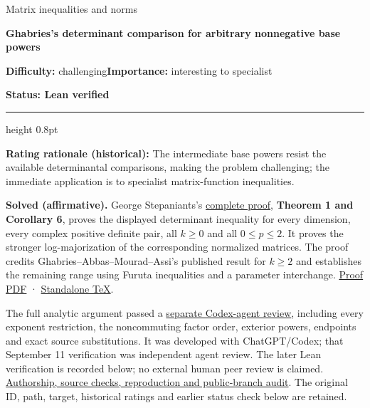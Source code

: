 \documentclass[11pt,a4paper]{article}
\makeatletter
\renewcommand{\subsection}{\Needspace{4\baselineskip}\@startsection{subsection}{2}{0pt}{9pt plus 1pt minus 1pt}{3pt}{\sffamily\bfseries\normalsize\color{ink}}}
\makeatother
\begin{document}
{\sffamily\small\color{muted}Matrix inequalities and norms\par}
\vspace{3pt}
{\raggedright{}\sffamily\bfseries\fontsize{21}{24}\selectfont\color{ink}Ghabries's
determinant comparison for arbitrary nonnegative base powers\par}
\vspace{7pt}
{\sffamily\small\textbf{Difficulty:} challenging\quad\textbf{Importance:} interesting
to specialist\par}
{\sffamily\small\bfseries\color{accent}Status: Lean verified\par}
\vspace{4pt}
{\color{accent}\hrule height 0.8pt}
\vspace{6pt}
\textbf{Rating rationale (historical):} The intermediate base powers
resist the available determinantal comparisons, making the problem
challenging; the immediate application is to specialist matrix-function
inequalities.

\subsection{Resolution --- 2026-09-11}\label{resolution-2026-09-11}

\textbf{Solved (affirmative).} George Stepaniants's
\href{https://github.com/ajt60gaibb/OpenProblemsInNLA/blob/main/matrix-inequalities-and-norms/MI-28/solution.md}{complete
proof}, \textbf{Theorem 1 and Corollary 6}, proves the displayed
determinant inequality for every dimension, every complex positive
definite pair, all \(k\ge0\) and all \(0\le p\le2\). It proves the
stronger log-majorization of the corresponding normalized matrices. The
proof credits Ghabries--Abbas--Mourad--Assi's published result for
\(k\ge2\) and establishes the remaining range using Furuta inequalities
and a parameter interchange.
\href{https://github.com/ajt60gaibb/OpenProblemsInNLA/blob/main/matrix-inequalities-and-norms/MI-28/solution.pdf}{Proof
PDF} ·
\href{https://github.com/ajt60gaibb/OpenProblemsInNLA/blob/main/matrix-inequalities-and-norms/MI-28/solution.tex}{Standalone
TeX}.

The full analytic argument passed a
\href{https://github.com/ajt60gaibb/OpenProblemsInNLA/blob/main/references/stepaniants-mi28-2026-09-11/verification/reviews/MI-28-review.md}{separate
Codex-agent review}, including every exponent restriction, the
noncommuting factor order, exterior powers, endpoints and exact source
substitutions. It was developed with ChatGPT/Codex; that September 11
verification was independent agent review. The later Lean verification
is recorded below; no external human peer review is claimed.
\href{https://github.com/ajt60gaibb/OpenProblemsInNLA/blob/main/references/stepaniants-mi28-2026-09-11/README.md}{Authorship,
source checks, reproduction and public-branch audit}. The original ID,
path, target, historical ratings and earlier status check below are
retained.
\end{document}
